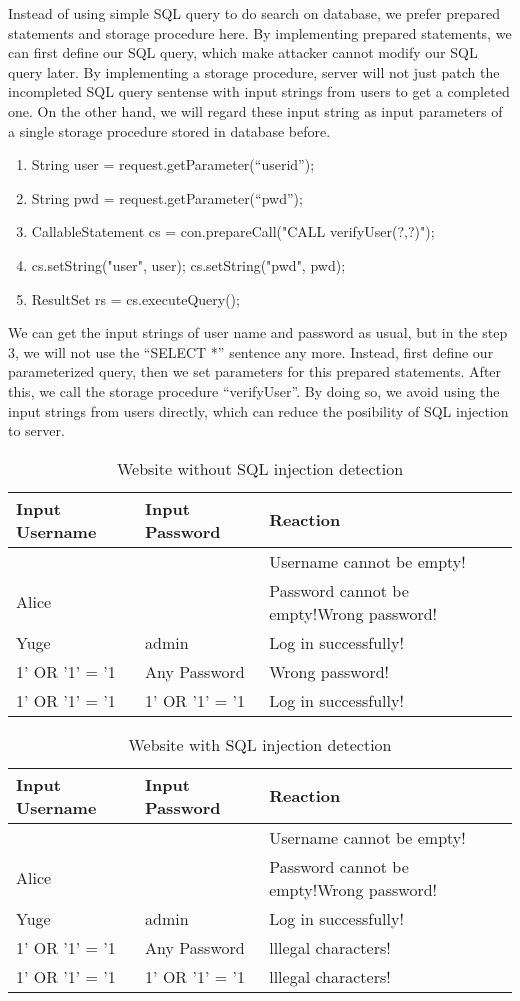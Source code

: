 \documentclass[12pt]{article}
\begin{document}
Instead of using simple SQL query to do search on database, we prefer prepared statements and storage procedure here. By implementing prepared statements, we can first define our SQL query, which make attacker cannot modify our SQL query later. By implementing a storage procedure, server will not just patch the incompleted SQL query sentense with input strings from users to get a completed one. On the other hand, we will regard these input string as input parameters of a single storage procedure stored in database before. \\
\begin{enumerate}
\item String user = request.getParameter(``userid''); 
\item String pwd = request.getParameter(``pwd'');
\item CallableStatement cs = con.prepareCall("{CALL verifyUser(?,?)}");
\item cs.setString("user", user); cs.setString("pwd", pwd);
\item ResultSet rs = cs.executeQuery();	
\end{enumerate} 
We can get the input strings of user name and password as usual, but in the step 3, we will not use the ``SELECT *'' sentence any more. Instead, first define our parameterized query, then we set parameters for this prepared statements. After this, we call the storage procedure ``verifyUser''. By doing so, we avoid using the input strings from users directly, which can reduce the posibility of SQL injection to server.

\begin{table}[htbp]
\centering
\caption{Website without SQL injection detection}
\begin{tabular}{ l l   p{9cm}  }
\hline
  Input Username & Input Password & Reaction \\
  \hline
   & & Username cannot be empty! \\
  Alice & &Password cannot be empty!Wrong password!  \\
  Yuge & admin & Log in successfully! \\
  1' OR '1' = '1 & Any Password & Wrong password! \\
  1' OR '1' = '1 & 1' OR '1' = '1 & Log in successfully! \\ 
    \hline
\end{tabular}
\end{table}

\begin{table}[htbp]
\centering
\caption{Website with SQL injection detection}
\begin{tabular}{ l l   p{9cm}  }
\hline
  Input Username & Input Password & Reaction \\
  \hline
   & & Username cannot be empty! \\
  Alice & &Password cannot be empty!Wrong password!  \\
  Yuge & admin & Log in successfully! \\
  1' OR '1' = '1 & Any Password & lllegal characters! \\
  1' OR '1' = '1 & 1' OR '1' = '1 & lllegal characters! \\ 
    \hline
\end{tabular}
\end{table}
\end{document}
